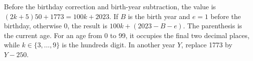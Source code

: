 Before the birthday correction and birth-year subtraction, the value is $(2k+5)50+1773=100k+2023$. If $B$ is the birth year and $e=1$ before the birthday, otherwise 0, the result is $100k+(2023-B-e)$. The parenthesis is the current age. For an age from 0 to 99, it occupies the final two decimal places, while $k\in\{3,\ldots,9\}$ is the hundreds digit. In another year $Y$, replace 1773 by $Y-250$.
